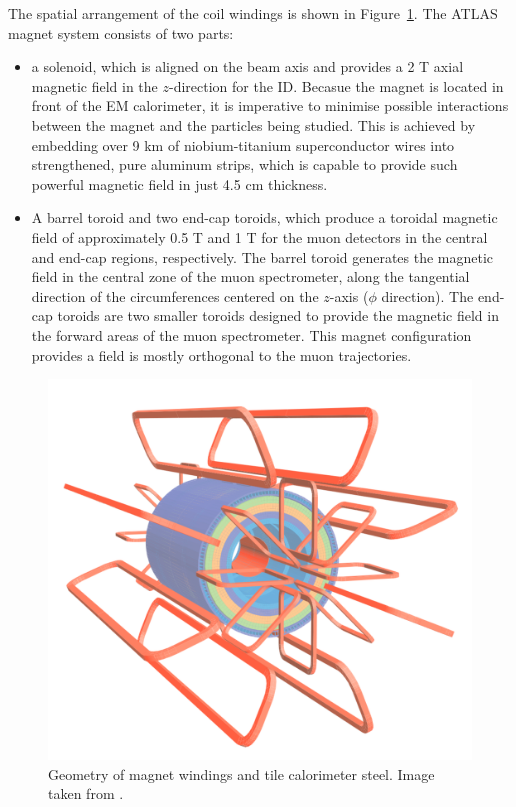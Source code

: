 The spatial arrangement of the coil windings is shown in 
Figure~\ref{fig:ATLAS_magnets}. 
The ATLAS magnet system consists of two parts:
\begin{itemize}
	\item a solenoid, which is aligned on the beam axis and 
	provides a 2 T axial magnetic field in the $z$-direction
	for the ID. Becasue the magnet is located in front
	of the EM calorimeter, it is imperative to minimise possible interactions
	between the magnet and the particles being studied.
	This is achieved by embedding over 9 km of niobium-titanium 
	superconductor wires into strengthened, pure aluminum strips, 
	which is capable to provide such powerful magnetic field
	in just 4.5 cm thickness. 
	\item  A barrel toroid and two end-cap toroids, 
	which produce a	toroidal magnetic field of approximately 
	0.5 T and 1 T for the muon detectors in the central 
	and end-cap regions, respectively. 
	The barrel toroid generates the magnetic field in the central zone 
	of the muon spectrometer, along the tangential direction of 
	the circumferences centered on the $z$-axis ($\phi$ direction). 
	The end-cap toroids are two smaller toroids designed to 
	provide the magnetic field in the forward areas of 
	the muon spectrometer. 
	This magnet configuration provides a field is mostly orthogonal 
	to the muon trajectories. 
	
\end{itemize}		



\begin{figure}[bht]
	\begin{centering}	
	\includegraphics[width=.56\textwidth]{Detector_plots/ATLAS magnets.png}
	\caption{Geometry of magnet windings and
	tile calorimeter steel. Image taken from \cite{PERF-2007-01}.}
	\label{fig:ATLAS_magnets}
	\end{centering}
\end{figure}


